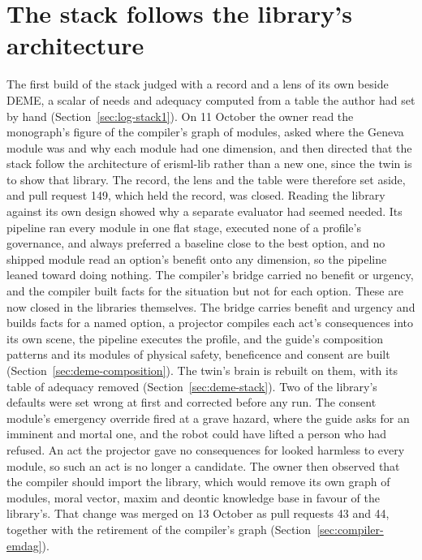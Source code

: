\section{The stack follows the library's architecture}\label{sec:log-deme}

The first build of the stack judged with a record and a lens of its own beside DEME, a scalar of
needs and adequacy computed from a table the author had set by hand
(Section~\ref{sec:log-stack1}).
On 11 October the owner read the monograph's figure of the compiler's graph of modules, asked where
the Geneva module was and why each module had one dimension, and then directed that the stack
follow the architecture of erisml-lib rather than a new one, since the twin is to show that
library.
The record, the lens and the table were therefore set aside, and pull request 149, which held the
record, was closed.
Reading the library against its own design showed why a separate evaluator had seemed needed.
Its pipeline ran every module in one flat stage, executed none of a profile's governance, and
always preferred a baseline close to the best option, and no shipped module read an option's
benefit onto any dimension, so the pipeline leaned toward doing nothing.
The compiler's bridge carried no benefit or urgency, and the compiler built facts for the situation
but not for each option.
These are now closed in the libraries themselves.
The bridge carries benefit and urgency and builds facts for a named option, a projector compiles
each act's consequences into its own scene, the pipeline executes the profile, and the guide's
composition patterns and its modules of physical safety, beneficence and consent are built
(Section~\ref{sec:deme-composition}).
The twin's brain is rebuilt on them, with its table of adequacy removed
(Section~\ref{sec:deme-stack}).
Two of the library's defaults were set wrong at first and corrected before any run.
The consent module's emergency override fired at a grave hazard, where the guide asks for an
imminent and mortal one, and the robot could have lifted a person who had refused.
An act the projector gave no consequences for looked harmless to every module, so such an act is
no longer a candidate.
The owner then observed that the compiler should import the library, which would remove its own
graph of modules, moral vector, maxim and deontic knowledge base in favour of the library's.
That change was merged on 13 October as pull requests 43 and 44, together with the retirement of
the compiler's graph (Section~\ref{sec:compiler-emdag}).

